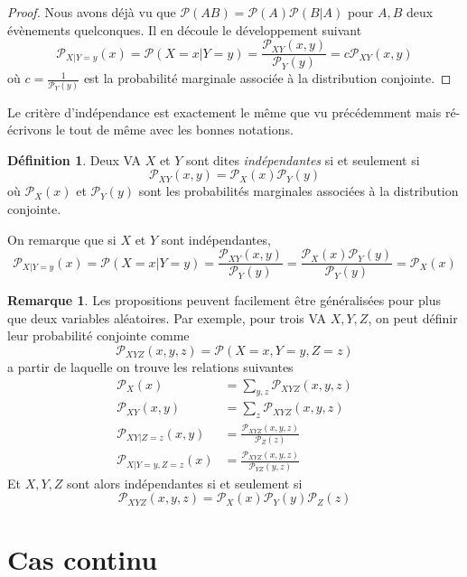 \documentclass[a4paper,12pt]{report}
\theoremstyle{definition}
\renewcommand{\(}{\left(}
\renewcommand{\)}{\right)}
\renewcommand{\P}{\mathcal{P}}
\renewcommand{\d}{\textit}
\newtheorem{defn}[thm]{Définition}
\newtheorem{rmk}[thm]{Remarque}
\begin{document}
        \begin{proof}
            Nous avons déjà vu que $\P(AB) = \P(A)\P(B|A)$ pour $A,B$ deux évènements quelconques. Il en découle le développement suivant
            $$\P_{X|Y=y}(x)=\P(X=x|Y=y)=\frac{\P_{XY}(x,y)}{\P_Y(y)}=c\P_{XY}(x,y)$$
            où $c=\frac{1}{\P_Y(y)}$ est la probabilité marginale associée à la distribution conjointe.
        \end{proof}
        
        Le critère d'indépendance est exactement le même que vu précédemment mais ré-écrivons le tout de même avec les bonnes notations.
        \begin{leftbar}
        \begin{defn}
            Deux VA $X$ et $Y$ sont dites \d{indépendantes} si et seulement si
            $$\P_{XY}(x,y)=\P_X(x)\P_Y(y)$$
            où $\P_X(x)$ et $\P_Y(y)$ sont les probabilités marginales associées à la distribution conjointe.
        \end{defn}
        \end{leftbar}
        
        On remarque que si $X$ et $Y$ sont indépendantes,
        $$\P_{X|Y=y}(x)=\P(X=x|Y=y)=\frac{\P_{XY}(x,y)}{\P_Y(y)}=\frac{\P_X(x)\P_Y(y)}{\P_Y(y)} = \P_X(x)$$
        
        \begin{rmk}
            Les propositions peuvent facilement être généralisées pour plus que deux variables aléatoires. Par exemple, pour trois VA $X,Y,Z$, on peut définir leur probabilité conjointe comme
            $$\P_{XYZ}(x,y,z) = \P(X=x,Y=y,Z=z)$$
            a partir de laquelle on trouve les relations suivantes 
            \begin{align*}
                \P_X(x) &= \sum_{y,z}\P_{XYZ}(x,y,z) \\
                \P_{XY}(x,y) &= \sum_z\P_{XYZ}(x,y,z) \\
                \P_{XY|Z=z}(x,y) &= \frac{\P_{XYZ}(x,y,z)}{\P_Z(z)} \\
                \P_{X|Y=y,Z=z}(x) &= \frac{\P_{XYZ}(x,y,z)}{\P_{YZ}(y,z)}
            \end{align*}
            Et $X,Y,Z$ sont alors indépendantes si et seulement si
            $$\P_{XYZ}(x,y,z) = \P_X(x)\P_Y(y)\P_Z(z)$$
        \end{rmk}
    
    \section{Cas continu}
    
\end{document}
